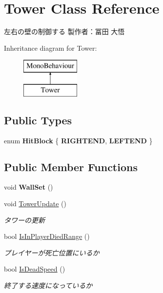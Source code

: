 \hypertarget{class_tower}{}\section{Tower Class Reference}
\label{class_tower}


左右の壁の制御する 製作者：冨田 大悟  


Inheritance diagram for Tower\+:\begin{figure}[H]
\begin{center}
\leavevmode
\includegraphics[height=2.000000cm]{class_tower}
\end{center}
\end{figure}
\subsection*{Public Types}
\begin{DoxyCompactItemize}
\item 
\mbox{\label{class_tower_ac92263cd69f43b776446028c755abe58}} 
enum {\bfseries Hit\+Block} \{ {\bfseries R\+I\+G\+H\+T\+E\+ND}, 
{\bfseries L\+E\+F\+T\+E\+ND}
 \}
\end{DoxyCompactItemize}
\subsection*{Public Member Functions}
\begin{DoxyCompactItemize}
\item 
\mbox{\label{class_tower_ac6af62bda9775ecb9f99bbe6850e1fc0}} 
void {\bfseries Wall\+Set} ()
\item 
void \hyperlink{class_tower_a4ea25831f8d1fcaac113e6aa4acaa4aa}{Tower\+Update} ()
\begin{DoxyCompactList}\small\item\em タワーの更新 \end{DoxyCompactList}\item 
bool \hyperlink{class_tower_afecc60cb00b3fa47cf08b4b49428eceb}{Is\+In\+Player\+Died\+Range} ()
\begin{DoxyCompactList}\small\item\em プレイヤーが死亡位置にいるか \end{DoxyCompactList}\item 
bool \hyperlink{class_tower_a689abb96a9ad55f182a393499d0e4469}{Is\+Dead\+Speed} ()
\begin{DoxyCompactList}\small\item\em 終了する速度になっているか \end{DoxyCompactList}\end{DoxyCompactItemize}
